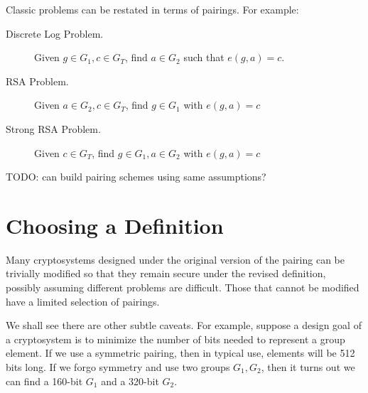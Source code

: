 Classic problems can be restated in terms of
pairings. For example:

\begin{description}
\item[Discrete Log Problem.]
Given $g \in G_1, c \in G_T$, find $a \in G_2$ such that $e(g,a) = c$.
\item[RSA Problem.]
Given $a \in G_2, c \in G_T$, find $g \in G_1$ with
$e(g,a) = c$
\item[Strong RSA Problem.]
Given $c \in G_T$, find $g \in G_1, a\in G_2$ with
$e(g,a) = c$
\end{description}

TODO: can build pairing schemes using same assumptions?

\section{Choosing a Definition}

Many cryptosystems designed under the original version of the pairing can
be trivially modified so that they remain secure under the revised
definition, possibly assuming different problems are difficult.
Those that cannot be modified have a limited selection of pairings.

We shall see there are other subtle caveats.
For example, suppose a design goal of a cryptosystem is to minimize the
number of bits needed to represent a group element. If we use
a symmetric pairing, then in typical use, elements will be 512 bits long.
If we forgo symmetry and use two groups $G_1, G_2$,
then it turns out we can find a 160-bit $G_1$ and a 320-bit $G_2$.
